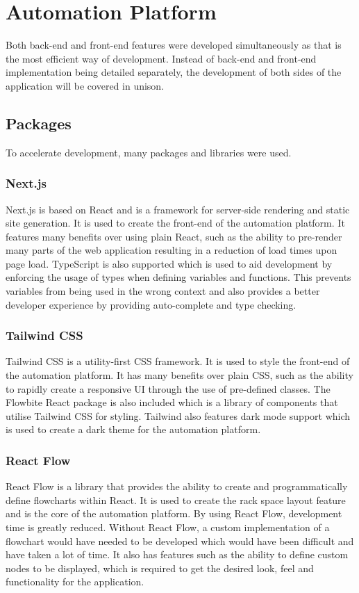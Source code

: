 \section{Automation Platform}
Both back-end and front-end features were developed simultaneously as that is the most efficient way of development. Instead of back-end and front-end implementation being detailed separately, the development of both sides of the application will be covered in unison.
\subsection{Packages}
To accelerate development, many packages and libraries were used.
\subsubsection{Next.js}
Next.js is based on React and is a framework for server-side rendering and static site generation. It is used to create the front-end of the automation platform. It features many benefits over using plain React, such as the ability to pre-render many parts of the web application resulting in a reduction of load times upon page load. TypeScript is also supported which is used to aid development by enforcing the usage of types when defining variables and functions. This prevents variables from being used in the wrong context and also provides a better developer experience by providing auto-complete and type checking.

\subsubsection{Tailwind CSS}
Tailwind CSS is a utility-first CSS framework. It is used to style the front-end of the automation platform. It has many benefits over plain CSS, such as the ability to rapidly create a responsive UI through the use of pre-defined classes. The Flowbite React package is also included which is a library of components that utilise Tailwind CSS for styling. Tailwind also features dark mode support which is used to create a dark theme for the automation platform.

\subsubsection{React Flow}
React Flow is a library that provides the ability to create and programmatically define flowcharts within React. It is used to create the rack space layout feature and is the core of the automation platform. By using React Flow, development time is greatly reduced. Without React Flow, a custom implementation of a flowchart would have needed to be developed which would have been difficult and have taken a lot of time. It also has features such as the ability to define custom nodes to be displayed, which is required to get the desired look, feel and functionality for the application.

